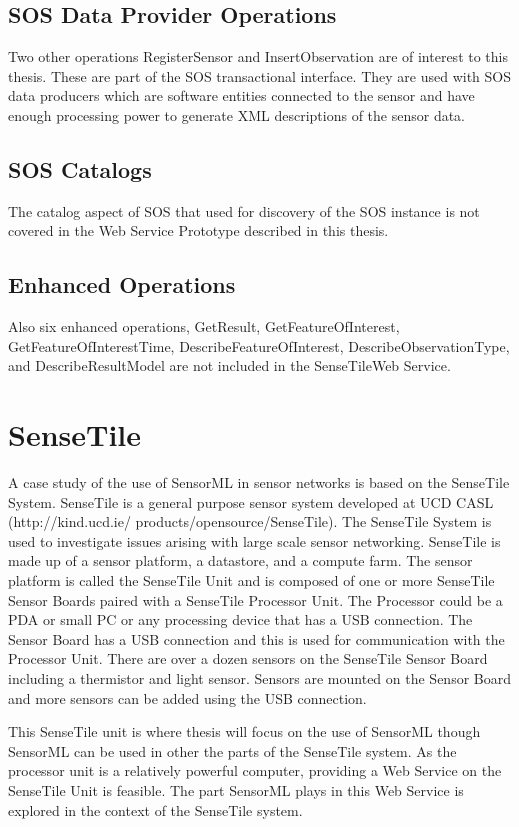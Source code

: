 \documentclass[]{final_report}
\begin{document}
\subsection{SOS Data Provider Operations}
Two other operations RegisterSensor and InsertObservation are of interest to this thesis. These are part of the SOS transactional interface. They are used with SOS data producers which are software entities connected to the sensor and have enough processing power to generate XML descriptions of the sensor data.

\subsection{SOS Catalogs}
The catalog aspect of SOS that used for discovery of the SOS instance is not covered in the Web Service Prototype described in this thesis. 
\subsection{Enhanced Operations}
Also six enhanced operations, GetResult,
GetFeatureOfInterest, GetFeatureOfInterestTime, DescribeFeatureOfInterest,
DescribeObservationType, and DescribeResultModel are not included in the SenseTileWeb Service.

\section{SenseTile}
A case study of the use of SensorML in sensor networks is based on the SenseTile System. SenseTile is a general purpose sensor system developed at UCD CASL (http://kind.ucd.ie/
products/opensource/SenseTile). The SenseTile System is used to investigate issues arising with large scale sensor networking. SenseTile is made up of a sensor platform, a datastore, and a compute farm.  The sensor platform is called the SenseTile Unit and is composed of one or more SenseTile Sensor Boards paired with a SenseTile Processor Unit. The Processor could be a PDA or small PC or any processing device that has a USB connection.  The Sensor Board has a USB connection and this is used for communication with the Processor Unit. There are over a dozen sensors on the SenseTile Sensor Board including a thermistor and light sensor. Sensors are mounted on the Sensor Board and more sensors can be added using the USB connection.

This SenseTile unit is where thesis will focus on the use of SensorML though SensorML can be used in other the parts of the SenseTile system. As the processor unit is  a relatively powerful computer, providing a Web Service on the SenseTile Unit is feasible. The part SensorML plays in this Web Service is explored in the context of the SenseTile system.
\end{document}

